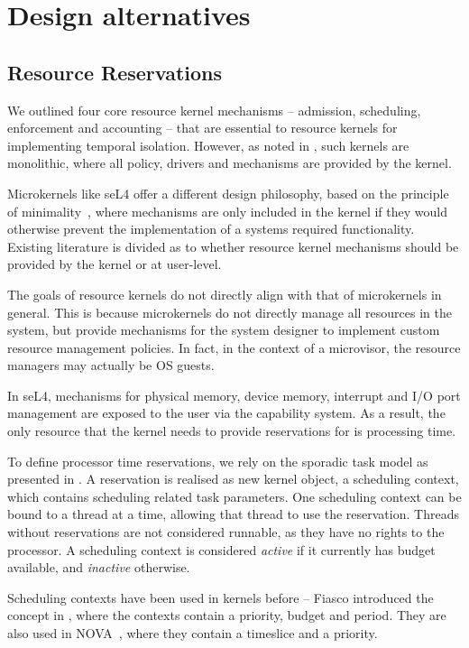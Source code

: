 \section{Design alternatives}

\subsection{Resource Reservations}
\label{sec:model-resource-reservations}

We outlined four core resource kernel mechanisms -- admission, scheduling, enforcement and accounting -- that are essential to resource kernels for implementing temporal isolation.
However, as noted in , such kernels are monolithic, where all policy, drivers and mechanisms are provided by the kernel.

Microkernels like seL4 offer a different design philosophy, based on the principle of minimality~\citep{Liedtke_95}, where mechanisms are only included in the kernel if they would otherwise prevent the implementation of a systems required functionality.
Existing literature is divided as to whether resource kernel mechanisms should be provided by the kernel or at user-level.

The goals of resource kernels do not directly align with that of microkernels in general.
This is because microkernels do not directly manage all resources in the system, but provide mechanisms for the system designer to implement custom resource management policies.
In fact, in the context of a microvisor, the resource managers may actually be OS guests.

In seL4, mechanisms for physical memory, device memory, interrupt and I/O port management are exposed to the user via the capability system.
As a result, the only resource that the kernel needs to provide reservations for is processing time.

To define processor time reservations, we rely on the sporadic task model as presented in .
A reservation is realised as new kernel object, a scheduling context, which contains scheduling related task parameters.
One scheduling context can be bound to a thread at a time, allowing that thread to use the reservation.
Threads without reservations are not considered runnable, as they have no rights to the processor.
A scheduling context is considered \emph{active} if it currently has budget available, and \emph{inactive} otherwise.

Scheduling contexts have been used in kernels before -- Fiasco introduced the concept in \citet{Steinberg_WH_05}, where the contexts contain a priority, budget and period.
They are also used in NOVA~\citep{Steinberg_Kauer_10}, where they contain a timeslice and a priority.

